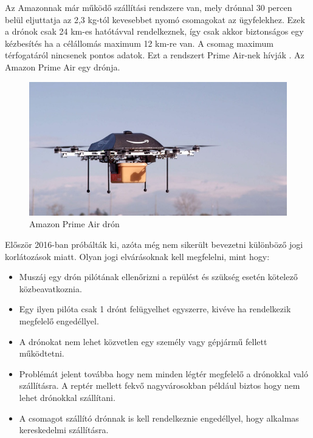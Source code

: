 

Az Amazonnak már működő szállítási rendszere van, mely drónnal 30 percen belül eljuttatja az 2,3 kg-tól kevesebbet nyomó csomagokat az ügyfelekhez.
Ezek a drónok csak 24 km-es hatótávval rendelkeznek, így csak akkor biztonságos egy kézbesítés ha a célállomás maximum 12 km-re van.
A csomag maximum térfogatáról nincsenek pontos adatok.
Ezt a rendszert Prime Air-nek hívják \cite{prime-air}. Az Amazon Prime Air egy  drónja.
\begin{figure}[h]
    \centering
    \includegraphics[scale=0.4]{images/prime.jpg}
    \caption{Amazon Prime Air drón}
    \label{fig:prime}
\end{figure}

Először 2016-ban próbálták ki, azóta még nem sikerült bevezetni különböző jogi korlátozások miatt. Olyan jogi elvárásoknak kell megfelelni, mint hogy:
\begin{itemize}
    \item Muszáj egy drón pilótának ellenőrizni a repülést és szükség esetén kötelező közbeavatkoznia.
    \item Egy ilyen pilóta csak 1 drónt felügyelhet egyszerre, kivéve ha rendelkezik megfelelő engedéllyel.
    \item A drónokat nem lehet közvetlen egy személy vagy gépjármű fellett működtetni.
    \item Problémát jelent továbba hogy nem minden légtér megfelelő a drónokkal való szállításra. A reptér mellett fekvő nagyvárosokban például biztos hogy nem lehet drónokkal szállítani.
    \item A csomagot szállító drónnak is kell rendelkeznie engedéllyel, hogy alkalmas kereskedelmi szállításra.
\end{itemize}

